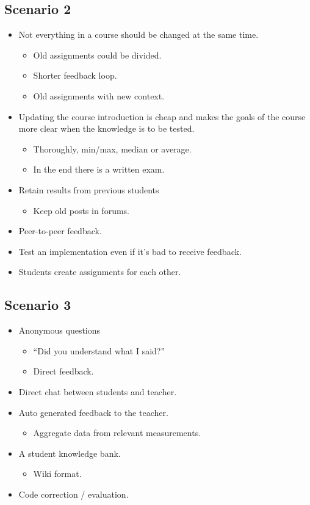 \subsection*{Scenario 2}
\begin{itemize}
\item Not everything in a course should be changed at the same time.
\begin{itemize}
\item Old assignments could be divided.
\item Shorter feedback loop.
\item Old assignments with new context.
\end{itemize}
\item Updating the course introduction is cheap and makes the goals of the course more clear when the knowledge is to be tested.
\begin{itemize}
\item Thoroughly, min/max, median or average.
\item In the end there is a written exam.
\end{itemize}
\item Retain results from previous students
\begin{itemize}
\item Keep old posts in forums.
\end{itemize}
\item Peer-to-peer feedback.
\item Test an implementation even if it's bad to receive feedback.
\item Students create assignments for each other.
\end{itemize}

\newpage
\subsection*{Scenario 3}
\begin{itemize}
\item Anonymous questions
\begin{itemize}
\item ``Did you understand what I said?''
\item Direct feedback.
\end{itemize}
\item Direct chat between students and teacher.
\item Auto generated feedback to the teacher.
\begin{itemize}
\item Aggregate data from relevant measurements.
\end{itemize}
\item A student knowledge bank.
\begin{itemize}
\item Wiki format.
\end{itemize}
\item Code correction / evaluation.
\end{itemize}

